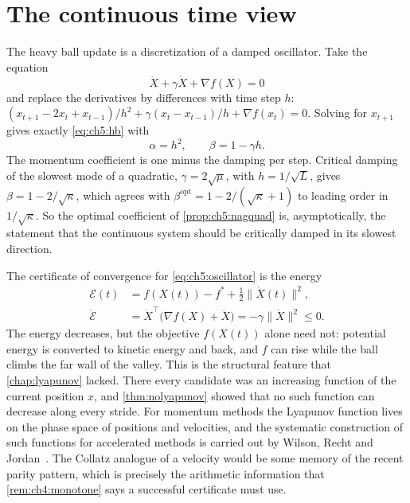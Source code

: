 \section{The continuous time view}\label{sec:ch5:ode}

The heavy ball update is a discretization of a damped oscillator.  Take the
equation
\begin{equation}\label{eq:ch5:oscillator}
  \ddot X+\gamma\dot X+\nabla f(X)=0
\end{equation}
and replace the derivatives by differences with time step $h$:
$(x_{t+1}-2x_t+x_{t-1})/h^2+\gamma(x_t-x_{t-1})/h+\nabla f(x_t)=0$.
Solving for $x_{t+1}$ gives exactly \eqref{eq:ch5:hb} with
\[
  \alpha=h^2,\qquad \beta=1-\gamma h .
\]
The momentum coefficient is one minus the damping per step.  Critical damping
of the slowest mode of a quadratic, $\gamma=2\sqrt\mu$, with $h=1/\sqrt L$,
gives $\beta=1-2/\sqrt\kappa$, which agrees with
$\beta^{\mathrm{opt}}=1-2/(\sqrt\kappa+1)$ to leading order in $1/\sqrt\kappa$.  So
the optimal coefficient of \cref{prop:ch5:nagquad} is, asymptotically, the
statement that the continuous system should be critically damped in its
slowest direction.

The certificate of convergence for \eqref{eq:ch5:oscillator} is the energy
\begin{equation}\label{eq:ch5:energy}
\begin{aligned}
  \mathcal E(t)&=f(X(t))-f^\ast+\tfrac12\|\dot X(t)\|^2,\\
  \dot{\mathcal E}&=\dot X^{\top}\bigl(\nabla f(X)+\ddot X\bigr)=-\gamma\|\dot X\|^2\le0 .
\end{aligned}
\end{equation}
The energy decreases, but the objective $f(X(t))$ alone need not: potential
energy is converted to kinetic energy and back, and $f$ can rise while the
ball climbs the far wall of the valley.  This is the structural feature that
\cref{chap:lyapunov} lacked.  There every candidate was an increasing function of the
current position $x$, and \cref{thm:nolyapunov} showed that no such function
can decrease along every stride.  For momentum methods the Lyapunov function
lives on the phase space of positions and velocities, and the systematic
construction of such functions for accelerated methods is carried out by
Wilson, Recht and Jordan~\cite{wilson2021}.  The Collatz analogue of a velocity
would be some memory of the recent parity pattern, which is precisely the
arithmetic information that \cref{rem:ch4:monotone} says a successful
certificate must use.

